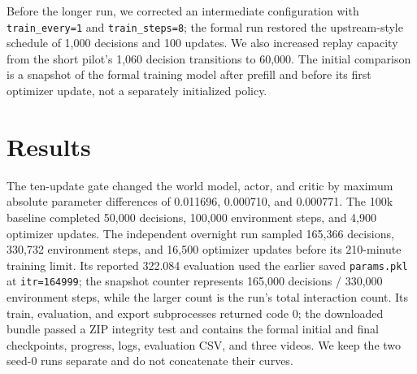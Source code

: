 \documentclass{article}
\begin{document}
Before the longer run, we corrected an intermediate configuration with \texttt{train\_every=1} and \texttt{train\_steps=8}; the formal run restored the upstream-style schedule of 1,000 decisions and 100 updates. We also increased replay capacity from the short pilot's 1,060 decision transitions to 60,000. The initial comparison is a snapshot of the formal training model after prefill and before its first optimizer update, not a separately initialized policy.

\begin{table}[t]
\caption{Independent iterations. Budget, replay, and initial-checkpoint handling changed together; this is not a one-factor ablation. The overnight run stopped at 330,732 environment steps.}
\centering\small
{}%
\end{table}

\section{Results}

The ten-update gate changed the world model, actor, and critic by maximum absolute parameter differences of 0.011696, 0.000710, and 0.000771. The 100k baseline completed 50,000 decisions, 100,000 environment steps, and 4,900 optimizer updates. The independent overnight run sampled 165,366 decisions, 330,732 environment steps, and 16,500 optimizer updates before its 210-minute training limit. Its reported 322.084 evaluation used the earlier saved \texttt{params.pkl} at \texttt{itr=164999}; the snapshot counter represents 165,000 decisions / 330,000 environment steps, while the larger count is the run's total interaction count. Its train, evaluation, and export subprocesses returned code 0; the downloaded bundle passed a ZIP integrity test and contains the formal initial and final checkpoints, progress, logs, evaluation CSV, and three videos. We keep the two seed-0 runs separate and do not concatenate their curves.
\end{document}
